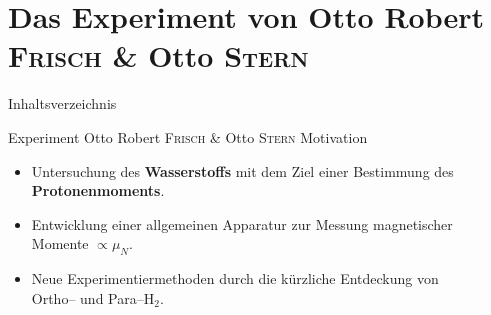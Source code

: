 \documentclass[t,9pt]{beamer}
\newcommand{\highlight}[3]{ \begin{textblock*}{#1}(#2,#3) \begin{tcolorbox} [enhanced,opacityfill=.1,colback=blue] \end{tcolorbox} \end{textblock*} } %
\begin{document}
        \section{Das Experiment von Otto Robert \textsc{Frisch} \& Otto \textsc{Stern}} 

        \begin{frame}{Inhaltsverzeichnis}
                \tableofcontents[currentsection]
        \end{frame}


        \begin{frame}{Experiment Otto Robert \textsc{Frisch} \& Otto \textsc{Stern}}
                Motivation
                \begin{itemize}
                        \item Untersuchung des \textbf{Wasserstoffs} mit dem Ziel einer Bestimmung des \textbf{Protonenmoments}. %
                        \item Entwicklung einer allgemeinen Apparatur zur Messung magnetischer\\Momente $\propto \mu _N$.
                        \item Neue Experimentiermethoden durch die kürzliche Entdeckung von \\Ortho-- und Para--$\text{H}_2$.
                \end{itemize}
                \hfill\tiny\cite{FrischStern1933}\normalsize
        \end{frame}

\end{document}
